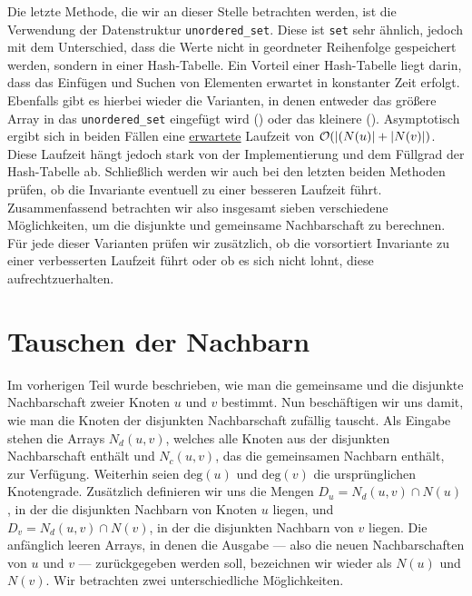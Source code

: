Die letzte Methode, die wir an dieser Stelle betrachten werden,
ist die Verwendung der Datenstruktur \texttt{unordered\_set}. Diese ist \texttt{set} sehr ähnlich, jedoch mit
dem Unterschied, dass die Werte nicht in geordneter Reihenfolge gespeichert werden, sondern
in einer Hash-Tabelle. Ein Vorteil einer Hash-Tabelle liegt darin, 
dass das Einfügen und Suchen von Elementen
erwartet in konstanter Zeit erfolgt.
Ebenfalls gibt es hierbei wieder die Varianten, 
in denen entweder das größere Array in das \texttt{unordered\_set} eingefügt wird (\USetSea) 
oder das kleinere (\SeaUSet).{}
Asymptotisch ergibt sich in beiden Fällen eine \underline{erwartete} Laufzeit von $\mathcal{O}(|(N(u)| + |N(v)|)$.
Diese Laufzeit hängt jedoch stark von der Implementierung und dem Füllgrad  der Hash-Tabelle ab. 
Schließlich werden wir auch bei den letzten beiden Methoden prüfen,
 ob die Invariante eventuell zu einer besseren Laufzeit führt.
\\

Zusammenfassend betrachten wir also insgesamt sieben verschiedene Möglichkeiten, um die disjunkte
und gemeinsame Nachbarschaft zu berechnen. Für jede dieser Varianten prüfen wir zusätzlich,
ob die vorsortiert Invariante zu einer verbesserten Laufzeit führt oder ob es sich
nicht lohnt, diese aufrechtzuerhalten.



\section{Tauschen der Nachbarn}
\label{sec:trade}
Im vorherigen Teil wurde beschrieben, wie man die gemeinsame und die disjunkte Nachbarschaft zweier Knoten
$u$ und $v$ bestimmt. Nun beschäftigen wir uns damit, wie man die Knoten der disjunkten Nachbarschaft zufällig tauscht. Als Eingabe 
stehen die Arrays $N_{d}(u,v)$, welches alle Knoten aus der disjunkten Nachbarschaft enthält
und $N_{c}(u,v)$, das die gemeinsamen Nachbarn enthält, zur Verfügung. Weiterhin seien $\text{deg}(u)$ und
$\text{deg}(v)$ die ursprünglichen Knotengrade. Zusätzlich definieren wir uns die Mengen
$D_{u} = N_{d}(u,v) \cap N(u)$, in der die disjunkten Nachbarn von Knoten $u$ liegen, 
und $D_{v} = N_{d}(u,v) \cap N(v)$, in der die disjunkten Nachbarn von $v$ liegen. Die anfänglich
leeren Arrays, in denen die Ausgabe --- also die neuen Nachbarschaften von $u$ und $v$ --- zurückgegeben 
werden soll, bezeichnen wir wieder als $N(u)$ und $N(v)$.
Wir betrachten zwei unterschiedliche Möglichkeiten.
\\

